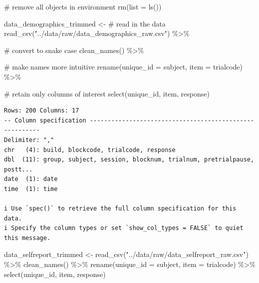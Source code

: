 \documentclass[
  letterpaper,
  DIV=11,
  numbers=noendperiod]{scrreprt}
\newenvironment{Shaded}{\begin{snugshade}}{\end{snugshade}}
\newcommand{\AttributeTok}[1]{\textcolor[rgb]{0.40,0.45,0.13}{#1}}
\newcommand{\CommentTok}[1]{\textcolor[rgb]{0.37,0.37,0.37}{#1}}
\newcommand{\FunctionTok}[1]{\textcolor[rgb]{0.28,0.35,0.67}{#1}}
\newcommand{\NormalTok}[1]{\textcolor[rgb]{0.00,0.23,0.31}{#1}}
\newcommand{\OtherTok}[1]{\textcolor[rgb]{0.00,0.23,0.31}{#1}}
\newcommand{\SpecialCharTok}[1]{\textcolor[rgb]{0.37,0.37,0.37}{#1}}
\newcommand{\StringTok}[1]{\textcolor[rgb]{0.13,0.47,0.30}{#1}}
\begin{document}
\begin{Shaded}
\begin{Highlighting}[]
\CommentTok{\# remove all objects in environment}
\FunctionTok{rm}\NormalTok{(}\AttributeTok{list =} \FunctionTok{ls}\NormalTok{())}


\NormalTok{data\_demographics\_trimmed }\OtherTok{\textless{}{-}}
  \CommentTok{\# read in the data}
  \FunctionTok{read\_csv}\NormalTok{(}\StringTok{"../data/raw/data\_demographics\_raw.csv"}\NormalTok{) }\SpecialCharTok{\%\textgreater{}\%}
  
  \CommentTok{\# convert to snake case}
  \FunctionTok{clean\_names}\NormalTok{() }\SpecialCharTok{\%\textgreater{}\%}
  
  \CommentTok{\# make names more intuitive}
  \FunctionTok{rename}\NormalTok{(}\AttributeTok{unique\_id =}\NormalTok{ subject,}
         \AttributeTok{item =}\NormalTok{ trialcode) }\SpecialCharTok{\%\textgreater{}\%}
  
  \CommentTok{\# retain only columns of interest}
  \FunctionTok{select}\NormalTok{(unique\_id, item, response)}
\end{Highlighting}
\end{Shaded}

\begin{verbatim}
Rows: 200 Columns: 17
-- Column specification --------------------------------------------------------
Delimiter: ","
chr   (4): build, blockcode, trialcode, response
dbl  (11): group, subject, session, blocknum, trialnum, pretrialpause, postt...
date  (1): date
time  (1): time

i Use `spec()` to retrieve the full column specification for this data.
i Specify the column types or set `show_col_types = FALSE` to quiet this message.
\end{verbatim}

\begin{Shaded}
\begin{Highlighting}[]
\NormalTok{data\_selfreport\_trimmed }\OtherTok{\textless{}{-}} 
  \FunctionTok{read\_csv}\NormalTok{(}\StringTok{"../data/raw/data\_selfreport\_raw.csv"}\NormalTok{) }\SpecialCharTok{\%\textgreater{}\%}
  \FunctionTok{clean\_names}\NormalTok{() }\SpecialCharTok{\%\textgreater{}\%}
  \FunctionTok{rename}\NormalTok{(}\AttributeTok{unique\_id =}\NormalTok{ subject,}
         \AttributeTok{item =}\NormalTok{ trialcode) }\SpecialCharTok{\%\textgreater{}\%}
  \FunctionTok{select}\NormalTok{(unique\_id, item, response)}
\end{Highlighting}
\end{Shaded}
\end{document}
